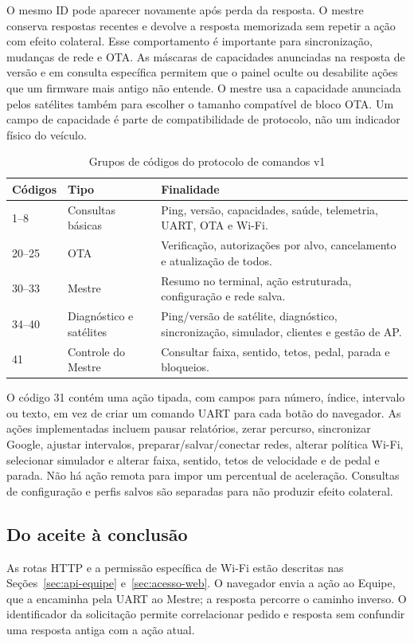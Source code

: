 O mesmo ID pode aparecer novamente após perda da resposta. O mestre conserva respostas recentes e devolve a resposta memorizada sem repetir a ação com efeito colateral. Esse comportamento é importante para sincronização, mudanças de rede e OTA. As máscaras de capacidades anunciadas na resposta de versão e em consulta específica permitem que o painel oculte ou desabilite ações que um firmware mais antigo não entende. O mestre usa a capacidade anunciada pelos satélites também para escolher o tamanho compatível de bloco OTA. Um campo de capacidade é parte de compatibilidade de protocolo, não um indicador físico do veículo.

\begin{table}[htbp]\centering\small
\caption{Grupos de códigos do protocolo de comandos v1}\label{tab:codigos-comandos}
\begin{tabularx}{\textwidth}{@{}l l X@{}}\toprule
Códigos & Tipo & Finalidade\\\midrule
1--8 & Consultas básicas & Ping, versão, capacidades, saúde, telemetria, UART, OTA e Wi-Fi.\\
20--25 & OTA & Verificação, autorizações por alvo, cancelamento e atualização de todos.\\
30--33 & Mestre & Resumo no terminal, ação estruturada, configuração e rede salva.\\
34--40 & Diagnóstico e satélites & Ping/versão de satélite, diagnóstico, sincronização, simulador, clientes e gestão de AP.\\
41 & Controle do Mestre & Consultar faixa, sentido, tetos, pedal, parada e bloqueios.\\\bottomrule
\end{tabularx}\end{table}

O código 31 contém uma ação tipada, com campos para número, índice, intervalo ou texto, em vez de criar um comando UART para cada botão do navegador. As ações implementadas incluem pausar relatórios, zerar percurso, sincronizar Google, ajustar intervalos, preparar/salvar/conectar redes, alterar política Wi-Fi, selecionar simulador e alterar faixa, sentido, tetos de velocidade e de pedal e parada. Não há ação remota para impor um percentual de aceleração. Consultas de configuração e perfis salvos são separadas para não produzir efeito colateral.

\subsection{Do aceite à conclusão}
As rotas HTTP e a permissão específica de Wi-Fi estão descritas nas Seções~\ref{sec:api-equipe} e~\ref{sec:acesso-web}. O navegador envia a ação ao Equipe, que a encaminha pela UART ao Mestre; a resposta percorre o caminho inverso. O identificador da solicitação permite correlacionar pedido e resposta sem confundir uma resposta antiga com a ação atual.

